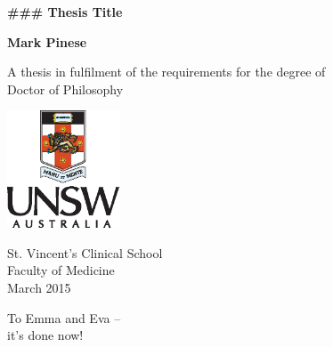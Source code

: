 \documentclass[11pt,a4paper,final,twoside]{memoir}
\begin{document}
\increaseBuild
\cleardoublepage

\begin{titlepage}
    \begin{center}
        \vspace*{1cm}
        
        \Large
        \textbf{### Thesis Title}
        
        
        \vspace{1.5cm}
        
        \normalsize
        \textbf{Mark Pinese}
        
        \vfill
        
        A thesis in fulfilment of the requirements for the degree of\\
        Doctor of Philosophy
        
        \vspace{2cm}
        
        \includegraphics[width=0.25\textwidth]{resources/PortraitColourPos}

        \vspace{1cm}

        St. Vincent's Clinical School\\
        Faculty of Medicine\\

		\vspace{0.8cm}
        March 2015
    \end{center}
\end{titlepage}


\cleardoublepage


\frontmatter

\cleardoublepage
{}
\begin{adjustwidth}{2em}{2em}
\noindent %
To Emma and Eva -- \\
\qquad it's done now!
\end{adjustwidth}
\end{document}
